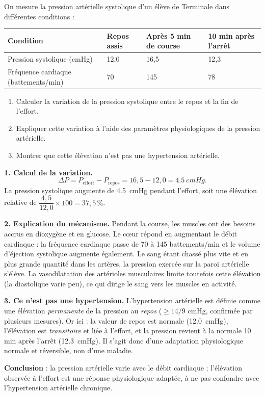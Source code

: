 \documentclass[11pt]{article}
\newcommand{\cle}[1]{{\popxbold\color{popdark}#1}}
\begin{document}
\begin{exoresolu}
On mesure la pression artérielle systolique d'un élève de Terminale dans différentes conditions :

\begin{center}
\begin{tabularx}{\linewidth}{|l|X|X|X|}\hline
\rowcolor{popblueL} Condition & Repos assis & Après 5 min de course & 10 min après l'arrêt \\ \hline
Pression systolique (cmHg) & 12,0 & 16,5 & 12,3 \\ \hline
Fréquence cardiaque (battements/min) & 70 & 145 & 78 \\ \hline
\end{tabularx}
\end{center}

\begin{enumerate}
\item Calculer la variation de la pression systolique entre le repos et la fin de l'effort.
\item Expliquer cette variation à l'aide des paramètres physiologiques de la pression artérielle.
\item Montrer que cette élévation n'est pas une hypertension artérielle.
\end{enumerate}

\tcblower

\textbf{1. Calcul de la variation.}
\[
\Delta P = P_{\text{effort}} - P_{\text{repos}} = 16{,}5 - 12{,}0 = \SI{4,5}{cmHg}.
\]
La pression systolique augmente de \SI{4,5}{cmHg} pendant l'effort, soit une élévation relative de $\dfrac{4{,}5}{12{,}0} \times 100 = 37{,}5\,\%$.

\textbf{2. Explication du mécanisme.} Pendant la course, les muscles ont des besoins accrus en dioxygène et en glucose. Le c\oe ur répond en augmentant le \cle{débit cardiaque} : la fréquence cardiaque passe de 70 à 145 battements/min et le volume d'éjection systolique augmente également. Le sang étant chassé plus vite et en plus grande quantité dans les artères, la pression exercée sur la paroi artérielle s'élève. La vasodilatation des artérioles musculaires limite toutefois cette élévation (la diastolique varie peu), ce qui dirige le sang vers les muscles en activité.

\textbf{3. Ce n'est pas une hypertension.} L'hypertension artérielle est définie comme une élévation \emph{permanente} de la pression au \emph{repos} ($\geq 14/9$ cmHg, confirmée par plusieurs mesures). Or ici : la valeur de repos est normale (\SI{12,0}{cmHg}), l'élévation est \emph{transitoire} et liée à l'effort, et la pression revient à la normale 10 min après l'arrêt (\SI{12,3}{cmHg}). Il s'agit donc d'une adaptation physiologique normale et réversible, non d'une maladie.

\textbf{Conclusion} : la pression artérielle varie avec le débit cardiaque ; l'élévation observée à l'effort est une réponse physiologique adaptée, à ne pas confondre avec l'hypertension artérielle chronique.
\end{exoresolu}
\end{document}

